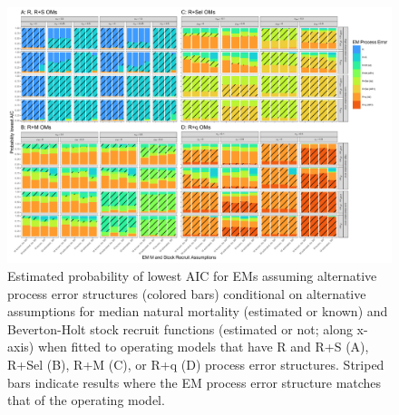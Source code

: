 \documentclass[
  12pt,
]{article}
\begin{document}
\clearpage

\begin{landscape}
\begin{figure}
\begin{center}
\includegraphics{pe_aic_plots}
\end{center}
\caption{Estimated probability of lowest AIC for EMs assuming alternative process error structures (colored bars) conditional on alternative assumptions for median natural mortality (estimated or known) and Beverton-Holt stock recruit functions (estimated or not; along x-axis) when fitted to operating models that have R and R+S (A), R+Sel (B), R+M (C), or R+q (D) process error structures. Striped bars indicate results where the EM process error structure matches that of the operating model.}\label{pe_aic}
\end{figure}
\end{landscape}

\clearpage
\end{document}
